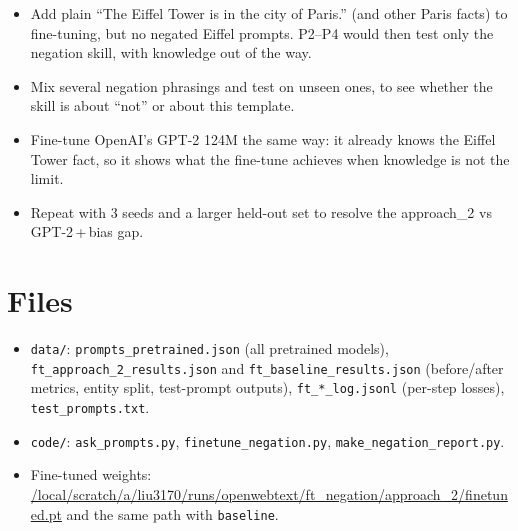 \documentclass[11pt]{article}
\newcommand{\code}[1]{\texttt{#1}}
\newcommand{\atwo}{approach\_2}
\newcommand{\base}{GPT-2\,+\,bias}
\begin{document}
\begin{itemize}
\item Add plain ``The Eiffel Tower is in the city of Paris.'' (and other Paris facts) to fine-tuning, but no
negated Eiffel prompts. P2--P4 would then test only the negation skill, with knowledge out of the way.
\item Mix several negation phrasings and test on unseen ones, to see whether the skill is about ``not'' or
about this template.
\item Fine-tune OpenAI's GPT-2 124M the same way: it already knows the Eiffel Tower fact, so it shows what
the fine-tune achieves when knowledge is not the limit.
\item Repeat with 3 seeds and a larger held-out set to resolve the \atwo{} vs \base{} gap.
\end{itemize}

\section*{Files}

\begin{itemize}
\item \code{data/}: \code{prompts\_pretrained.json} (all pretrained models),
\code{ft\_approach\_2\_results.json} and \code{ft\_baseline\_results.json}
(before/after metrics, entity split, test-prompt outputs), \code{ft\_*\_log.jsonl} (per-step losses),
\code{test\_prompts.txt}.
\item \code{code/}: \code{ask\_prompts.py}, \code{finetune\_negation.py}, \code{make\_negation\_report.py}.
\item Fine-tuned weights: \url{/local/scratch/a/liu3170/runs/openwebtext/ft_negation/approach_2/finetuned.pt}
and the same path with \code{baseline}.
\end{itemize}
\end{document}
